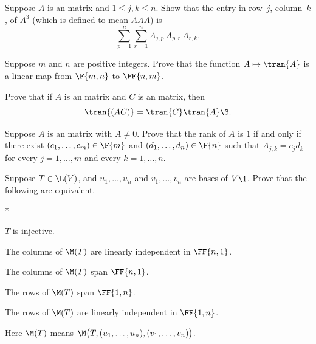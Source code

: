 \exercise
Suppose $A$ is an  matrix and $1 \le j, k \le n$. Show that the entry in row~$j$, column~$k$, of $A^3$ (which is defined to mean $AAA$) is
\[
\sum_{p=1}^n \sum_{r=1}^n A_{j, p} \, A_{p, r} \, A_{r, k}.
\]
\vspace{-10bp}


\exercise
Suppose $m$ and $n$ are positive integers. Prove that the function $A \mapsto \tran{A}$ is a linear map from $\F{m, n}$ to
$\FF{n, m}$.\label{3translinear}


\pagebreak[3]

\exercise
Prove that if $A$ is an  matrix and $C$ is an  matrix, then\label{3tran}
\[
\tran{(AC)} = \tran{C} \tran{A}\3.
\]
\exercisedisplayend
{}


\pagebreak[3]

\exercise
Suppose $A$ is an  matrix with $A \ne 0$. Prove that the rank of $A$ is $1$ if and only if there exist $(c_1, \dots, c_m) \in \F{m}$ and $(d_1, \dots, d_n)\in \F{n}$ such that $A_{j,k} = c_j d_k$ for every $j = 1, \dots, m$ and every $k = 1, \dots, n$.


\exercise
Suppose $T \in \L(V)$, and $u_1, \dots, u_n$ and $v_1, \dots, v_n$ are bases of $V\1$. Prove that the following are equivalent.
\begin{subtheorem}*
\item
$T$ is injective.
\item
The columns of $\M(T)$ are linearly independent in $\FF{n,1}$.
\item
The columns of $\M(T)$ span $\FF{n,1}$.
\item
The rows of $\M(T)$ span $\FF{1,n}$.
\item
The rows of $\M(T)$ are linearly independent in $\FF{1,n}$.
\end{subtheorem}
Here $\M(T)$ means $\M\bigl( T, (u_1, \dots, u_n), (v_1, \dots, v_n) \bigr)$.



